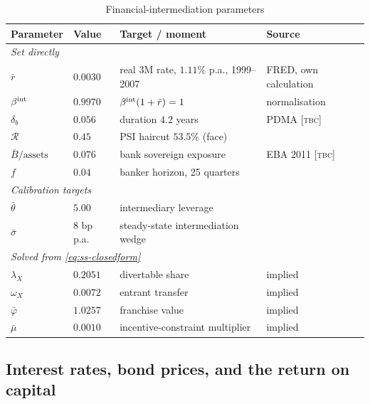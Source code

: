 \begin{table}[t]
\centering
\caption{Financial-intermediation parameters}
\label{tab:bankcal}
\begin{tabular}{llll}
\hline\hline
Parameter & Value & Target / moment & Source \\
\hline
\multicolumn{4}{l}{\emph{Set directly}}\\
$\bar r$              & $0.0030$ & real 3M rate, $1.11\%$ p.a., 1999--2007 & FRED, own calculation \\
$\beta^{\rm int}$     & $0.9970$ & $\beta^{\rm int}(1+\bar r)=1$            & normalisation \\
$\delta_b$            & $0.056$  & duration $4.2$ years                     & PDMA [\textsc{tbc}] \\
$\mathcal{R}$         & $0.45$   & PSI haircut $53.5\%$ (face)              & \citet{zettelmeyer2013} \\
$\bar B/\text{assets}$& $0.076$  & bank sovereign exposure                  & EBA 2011 [\textsc{tbc}] \\
$f$                   & $0.04$   & banker horizon, 25 quarters              & \citet{bocola2016} \\
\multicolumn{4}{l}{\emph{Calibration targets}}\\
$\bar\theta$          & $5.00$   & intermediary leverage                    & \citet{bocola2016} \\
$\bar\sigma$          & $8$ bp p.a. & steady-state intermediation wedge     & \citet{bocola2016} \\
\multicolumn{4}{l}{\emph{Solved from \eqref{eq:ss-closedform}}}\\
$\lambda_X$           & $0.2051$ & divertable share                         & implied \\
$\omega_X$            & $0.0072$ & entrant transfer                         & implied \\
$\bar\varphi$         & $1.0257$ & franchise value                          & implied \\
$\bar\mu$             & $0.0010$ & incentive-constraint multiplier          & implied \\
\hline\hline
\end{tabular}
\end{table}


\subsection{Interest rates, bond prices, and the return on capital}
\label{sec:ratecal}

